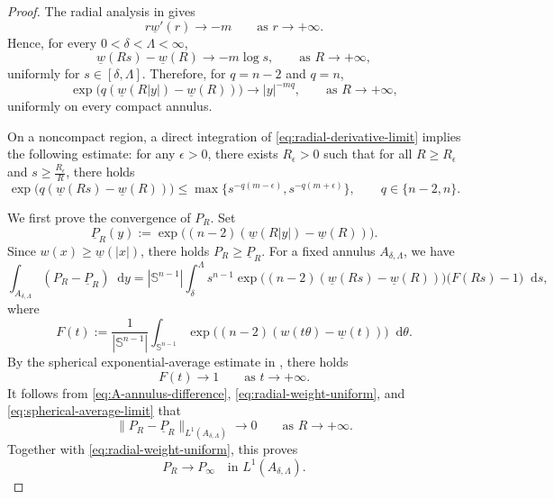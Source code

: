 \documentclass[10pt,a4paper]{amsart}
\numberwithin{equation}{section}
\newcommand{\dd}{\mathop{}\!\mathrm{d}}%
\begin{document}
\begin{proof}
The radial analysis in \cite[Lemma 2.6]{M} gives
\begin{equation}\label{eq:radial-derivative-limit}
    r\underline w'(r)\to -m \qquad
    \text{as } r\to +\infty.
\end{equation}
Hence, for every $0<\delta<\Lambda<\infty$,
\[
    \underline w(Rs)-\underline w(R)
    \to -m\log s,\qquad
    \text{as }R\to +\infty,
\]
uniformly for $s\in[\delta,\Lambda]$.  Therefore, for $q=n-2$ and
$q=n$,
\begin{equation}\label{eq:radial-weight-uniform}
    \exp\bigl(q(\underline w(R|y|)-\underline w(R))\bigr)
    \to |y|^{-mq},\qquad
    \text{as }R\to +\infty,
\end{equation}
uniformly on every compact annulus.

On a noncompact region,  a direct  integration of \cref{eq:radial-derivative-limit}  implies the following estimate: for any $\epsilon>0$, there exists $R_\epsilon>0$ such that for all $R\geq R_\epsilon$ and $s\geq \frac{R_\epsilon}{R}$, there holds
\begin{equation}\label{eq:potter-bound}
     \exp\bigl(q(\underline w(Rs)-\underline w(R))\bigr)
    \leq \max\{ s^{-q(m-\epsilon)}, s^{-q(m+\epsilon)} \}, 
    \qquad q\in\{n-2,n\}.
\end{equation}

We first prove the convergence of $P_R$.  Set
\[
    \underline P_R(y)
    :=\exp\bigl((n-2)(\underline w(R|y|)-\underline w(R))\bigr).
\]
Since $w(x)\geq\underline w(|x|)$, there holds $P_R\geq \underline P_R.$
For a fixed annulus $A_{\delta,\Lambda}$, we have
\begin{equation}\label{eq:A-annulus-difference}
\int_{A_{\delta,\Lambda}}(P_R-\underline P_R)\dd y
=
|\mathbb S^{n-1}|
\int_\delta^\Lambda s^{n-1}
\exp\bigl((n-2)(\underline w(Rs)-\underline w(R))\bigr)
\bigl(F(Rs)-1\bigr)\dd s,
\end{equation}
where
\[
    F(t):=
    \frac{1}{|\mathbb S^{n-1}|}\int_{\mathbb S^{n-1}}
    \exp\bigl((n-2)(w(t\theta)-\underline w(t))\bigr)\dd \theta.
\]
By the spherical exponential-average estimate in
\cite[Lemma 4.7]{M}, there holds
\begin{equation}\label{eq:spherical-average-limit}
    F(t)\to 1\qquad 
    \text{as }t\to+\infty.
\end{equation}
 It follows from
\cref{eq:A-annulus-difference}, \cref{eq:radial-weight-uniform}, and
\cref{eq:spherical-average-limit} that
\[
    \|P_R-\underline P_R\|_{L^1(A_{\delta,\Lambda})}
    \to 0\qquad
    \text{as } R\to+\infty.
\]
Together with \cref{eq:radial-weight-uniform}, this proves
\begin{equation}\label{eq:A-L1-annulus}
    P_R\to P_\infty
    \quad\text{in }L^1(A_{\delta,\Lambda}).
\end{equation}


\end{proof}
\end{document}
